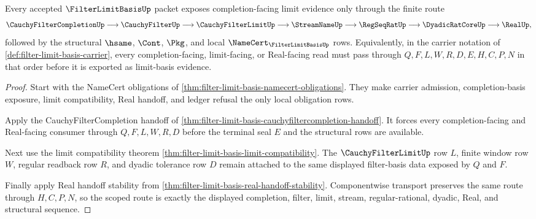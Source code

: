 \begin{theorem}
\label{thm:filter-limit-basis-scoped-route}
Every accepted $\FilterLimitBasisUp$ packet exposes completion-facing limit evidence only through the finite route
$$
\CauchyFilterCompletionUp \longrightarrow \CauchyFilterUp
  \longrightarrow \CauchyFilterLimitUp \longrightarrow \StreamNameUp
  \longrightarrow \RegSeqRatUp \longrightarrow \DyadicRatCoreUp
  \longrightarrow \RealUp ,
$$
followed by the structural $\hsame$, $\Cont$, $\Pkg$, and local $\NameCert_{\FilterLimitBasisUp}$ rows. Equivalently, in the carrier notation of \autoref{def:filter-limit-basis-carrier}, every completion-facing, limit-facing, or Real-facing read must pass through $Q,F,L,W,R,D,E,H,C,P,N$ in that order before it is exported as limit-basis evidence.
\end{theorem}
\begin{proof}
Start with the NameCert obligations of \autoref{thm:filter-limit-basis-namecert-obligations}. They make carrier admission, completion-basis exposure, limit compatibility, Real handoff, and ledger refusal the only local obligation rows.

Apply the CauchyFilterCompletion handoff of \autoref{thm:filter-limit-basis-cauchyfiltercompletion-handoff}. It forces every completion-facing and Real-facing consumer through $Q,F,L,W,R,D$ before the terminal seal $E$ and the structural rows are available.

Next use the limit compatibility theorem \autoref{thm:filter-limit-basis-limit-compatibility}. The $\CauchyFilterLimitUp$ row $L$, finite window row $W$, regular readback row $R$, and dyadic tolerance row $D$ remain attached to the same displayed filter-basis data exposed by $Q$ and $F$.

Finally apply Real handoff stability from \autoref{thm:filter-limit-basis-real-handoff-stability}. Componentwise transport preserves the same route through $H,C,P,N$, so the scoped route is exactly the displayed completion, filter, limit, stream, regular-rational, dyadic, Real, and structural sequence.
\end{proof}

